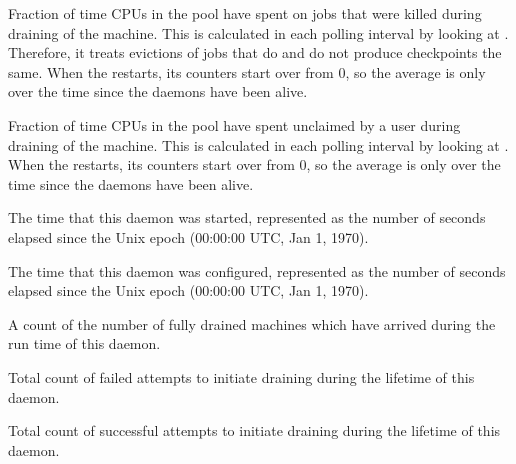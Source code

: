 \begin{description}

\item[\AdAttr{AvgDrainingBadput}:] Fraction of time CPUs
  in the pool have spent on jobs that were killed during draining of the
  machine.  This is calculated in each polling interval by looking
  at .  
  Therefore, it treats evictions of jobs that do and do not produce
  checkpoints the same.
  When the  restarts, its counters start over from 0, so the
  average is only over the time since the daemons have been alive.

\item[\AdAttr{AvgDrainingUnclaimedTime}:] Fraction of time CPUs
  in the pool have spent unclaimed by a user during
  draining of the machine.  This is calculated in each polling interval
  by looking at .  
  When the  restarts, its counters start over from 0, so the
  average is only over the time since the daemons have been alive.

\item[\AdAttr{DaemonStartTime}:] The time that this daemon was started, 
  represented as the number of seconds elapsed since
  the Unix epoch (00:00:00 UTC, Jan 1, 1970).

\item[\AdAttr{DaemonLastReconfigTime}:] The time that this daemon was configured,
  represented as the number of seconds elapsed since
  the Unix epoch (00:00:00 UTC, Jan 1, 1970).

\item[\AdAttr{DrainedMachines}:] A count of the number of fully drained 
machines which have arrived during the run time of this  daemon.

\item[\AdAttr{DrainFailures}:] Total count of failed attempts
  to initiate draining during the lifetime of this  daemon.

\item[\AdAttr{DrainSuccesses}:] Total count of successful attempts
  to initiate draining during the lifetime of this  daemon.


\end{description}
